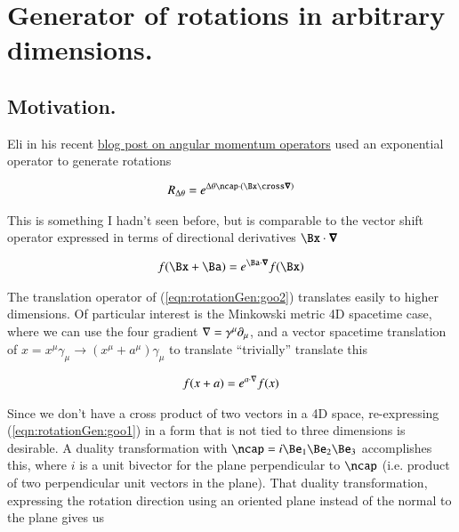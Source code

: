 %

\chapter{Generator of rotations in arbitrary dimensions.}
\label{chap:rotationGenerator}
{}
\date{Aug 31, 2009}

\beginArtNoToc

\section{Motivation.}

Eli in his recent \href{http://behindtheguesses.blogspot.com/2009/08/noncommuting-rotation-and-angular.html}{blog post on angular momentum operators} used an exponential operator to generate rotations

\begin{align}\label{eqn:rotationGen:goo1}
R_{\Delta\theta} = e^{\Delta\theta \ncap \cdot (\Bx \cross \spacegrad)}
\end{align}

This is something I hadn't seen before, but is comparable to the vector shift operator expressed in terms of directional derivatives $\Bx \cdot \spacegrad$

\begin{align}\label{eqn:rotationGen:goo2}
f(\Bx + \Ba) = e^{\Ba \cdot \spacegrad} f(\Bx)
\end{align}

The translation operator of (\ref{eqn:rotationGen:goo2}) translates easily to higher dimensions.  Of particular interest is the Minkowski metric 4D spacetime case, where we can use the four gradient $\nabla = \gamma^\mu \partial_\mu$, and a vector spacetime translation of $x = x^\mu \gamma_\mu \rightarrow (x^\mu + a^\mu) \gamma_\mu$ to translate ``trivially'' translate this

\begin{align}\label{eqn:rotationGen:goo3}
f(x + a) = e^{a \cdot \nabla} f(x)
\end{align}

Since we don't have a cross product of two vectors in a 4D space, re-expressing (\ref{eqn:rotationGen:goo1}) in a form that is not tied to three dimensions is desirable.  A duality transformation with $\ncap = i \Be_1 \Be_2 \Be_3$ accomplishes this, where $i$ is a unit bivector for the plane perpendicular to $\ncap$ (i.e. product of two perpendicular unit vectors in the plane).  That duality transformation, expressing the rotation direction using an oriented plane instead of the normal to the plane gives us

